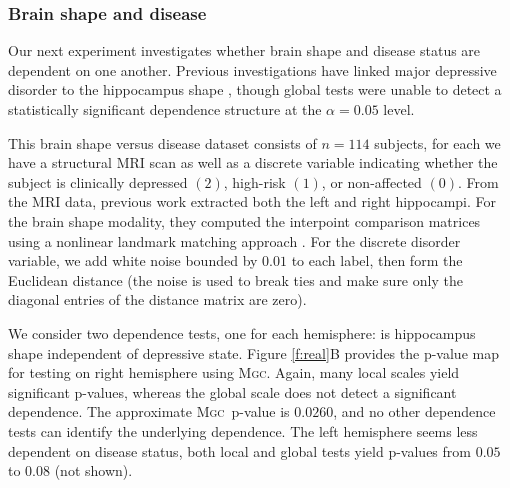 \documentclass[11pt]{article}
\newcommand{\note}[2][]{\added[#1,remark={#2}]{}}
\providecommand{\sct}[1]{{\normalfont\textsc{#1}}}
\newcommand{\Mgc}{\sct{Mgc}}
\newcommand{\Hhg}{\sct{Hhg}}
\newcommand{\Dcorr}{\sct{Dcorr}}
\newcommand{\Mcorr}{\sct{Mcorr}}
\newcommand{\Mantel}{\sct{Mantel}}
\newcommand{\jv}[1]{{\note{jv: #1}}}
\begin{document}
\subsubsection*{Brain shape and disease} %


Our next experiment investigates whether brain shape and disease status are dependent on one another.  Previous investigations have linked major depressive disorder to the hippocampus shape \cite{ParkEtAl2008,PosenerEtAl2003}, though global tests were unable to detect a statistically significant dependence structure at the $\alpha=0.05$ level.



This brain shape versus disease dataset consists of $n=114$ subjects, for each we have a structural MRI scan as well as a discrete variable indicating whether the subject is clinically depressed $(2)$, high-risk $(1)$, or non-affected $(0)$.  From the MRI data, previous work  extracted both the left and right hippocampi.   For the brain shape modality, they computed the interpoint comparison matrices using a nonlinear landmark matching approach \cite{ParkEtAl2008,BegEtAl2005}. For the discrete disorder variable, we add white noise bounded by $0.01$ to each label, then form the Euclidean distance (the noise is used to break ties and make sure only the diagonal entries of the distance matrix are zero).

We consider two dependence tests, one for each hemisphere: is hippocampus shape independent of depressive state.
Figure \ref{f:real}B provides the p-value map for testing on right hemisphere using \Mgc. Again, many local scales yield significant p-values, whereas the global scale does not detect a significant dependence. The approximate \Mgc~p-value is $0.0260$, and no other dependence tests can identify the underlying  dependence. The left hemisphere seems less dependent on disease status, 
both local and global tests yield  p-values from $0.05$ to $0.08$ (not shown). 
\jv{let's check whether anybody knew that?}
\end{document}
